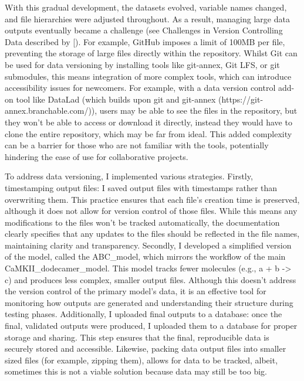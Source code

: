 \documentclass[
  11pt,
  letterpaper,
]{scrreprt}
\begin{document}
With this gradual development, the datasets evolved, variable names
changed, and file hierarchies were adjusted throughout. As a result,
managing large data outputs eventually became a challenge (see
Challenges in Version Controlling Data described by
{[}\citeproc{ref-turingwaycommunity2019TuringWayHandbook}{357}{]}). For
example, GitHub imposes a limit of 100MB per file, preventing the
storage of large files directly within the repository. Whilst Git can be
used for data versioning by installing tools like git-annex, Git LFS, or
git submodules, this means integration of more complex tools, which can
introduce accessibility issues for newcomers. For example, with a data
version control add-on tool like DataLad (which builds upon git and
git-annex (https://git-annex.branchable.com/)), users may be able to see
the files in the repository, but they won't be able to access or
download it directly, instead they would have to clone the entire
repository, which may be far from ideal. This added complexity can be a
barrier for those who are not familiar with the tools, potentially
hindering the ease of use for collaborative projects.

To address data versioning, I implemented various strategies. Firstly,
timestamping output files: I saved output files with timestamps rather
than overwriting them. This practice ensures that each file's creation
time is preserved, although it does not allow for version control of
those files. While this means any modifications to the files won't be
tracked automatically, the documentation clearly specifies that any
updates to the files should be reflected in the file names, maintaining
clarity and transparency. Secondly, I developed a simplified version of
the model, called the ABC\_model, which mirrors the workflow of the main
CaMKII\_dodecamer\_model. This model tracks fewer molecules (e.g., a + b
-\textgreater{} c) and produces less complex, smaller output files.
Although this doesn't address the version control of the primary model's
data, it is an effective tool for monitoring how outputs are generated
and understanding their structure during testing phases. Additionally, I
uploaded final outputs to a database: once the final, validated outputs
were produced, I uploaded them to a database for proper storage and
sharing. This step ensures that the final, reproducible data is securely
stored and accessible. Likewise, packing data output files into smaller
sized files (for example, zipping them), allows for data to be tracked,
albeit, sometimes this is not a viable solution because data may still
be too big.
\end{document}
